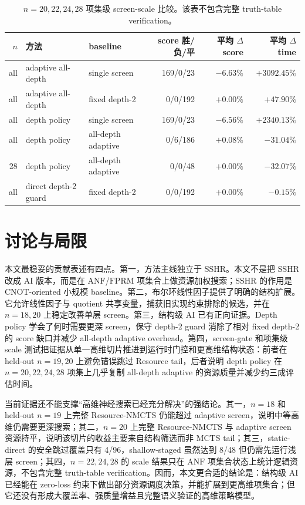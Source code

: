 \documentclass[UTF8,fontset=macnew,11pt]{ctexart}
\newcommand{\method}{Resource-NMCTS}
\newcommand{\anf}{\ensuremath{\mathrm{ANF}}}
\newcommand{\fprm}{\ensuremath{\mathrm{FPRM}}}
\begin{document}
\begin{table}[t]
\centering
\scriptsize
\caption{$n=20,22,24,28$ 项集级 screen-scale 比较。该表不包含完整 truth-table verification。}
\label{tab:scale}
\begin{tabular}{rllrrr}
\toprule
$n$ & 方法 & baseline & score 胜/负/平 & 平均 $\Delta$ score & 平均 $\Delta$ time \\
\midrule
all & adaptive all-depth & single screen & 169/0/23 & $-6.63\%$ & $+3092.45\%$ \\
all & adaptive all-depth & fixed depth-2 & 0/0/192 & $+0.00\%$ & $+47.90\%$ \\
all & depth policy & single screen & 169/0/23 & $-6.56\%$ & $+2340.13\%$ \\
all & depth policy & all-depth adaptive & 0/6/186 & $+0.08\%$ & $-31.04\%$ \\
28 & depth policy & all-depth adaptive & 0/0/48 & $+0.00\%$ & $-32.07\%$ \\
all & direct depth-2 guard & fixed depth-2 & 0/0/192 & $+0.00\%$ & $-0.15\%$ \\
\bottomrule
\end{tabular}
\end{table}

\section{讨论与局限}

本文最稳妥的贡献表述有四点。第一，方法主线独立于 SSHR。本文不是把 SSHR 改成 AI 版本，而是在 \anf{}/\fprm{} 项集合上做资源加权搜索；SSHR 的作用是 CNOT-oriented 小规模 baseline。第二，布尔环线性因子提供了明确的结构扩展。它允许线性因子与 quotient 共享变量，捕获旧实现约束排除的候选，并在 $n=18,20$ 上稳定改善单层 screen。第三，结构级 AI 已有正向证据。Depth policy 学会了何时需要更深 screen，保守 depth-2 guard 消除了相对 fixed depth-2 的 score 缺口并减少 all-depth adaptive overhead。第四，screen-gate 和项集级 scale 测试把证据从单一高维切片推进到运行时门控和更高维结构状态：前者在 held-out $n=19,20$ 上避免错误跳过 Resource tail，后者说明 depth policy 在 $n=20,22,24,28$ 项集上几乎复制 all-depth adaptive 的资源质量并减少约三成评估时间。

当前证据还不能支撑“高维神经搜索已经充分解决”的强结论。其一，$n=18$ 和 held-out $n=19$ 上完整 \method{} 仍能超过 adaptive screen，说明中等高维仍需要更深搜索；其二，$n=20$ 上完整 \method{} 与 adaptive screen 资源持平，说明该切片的收益主要来自结构筛选而非 MCTS tail；其三，static-direct 的安全跳过覆盖只有 4/96，shallow-staged 虽然达到 8/48 但仍需先运行浅层 screen；其四，$n=22,24,28$ 的 scale 结果只在 \anf{} 项集合状态上统计逻辑资源，不包含完整 truth-table verification。因而，本文更合适的结论是：结构级 AI 已经能在 zero-loss 约束下做出部分资源调度决策，并能扩展到更高维项集合；但它还没有形成大覆盖率、强质量增益且完整语义验证的高维策略模型。
\end{document}
